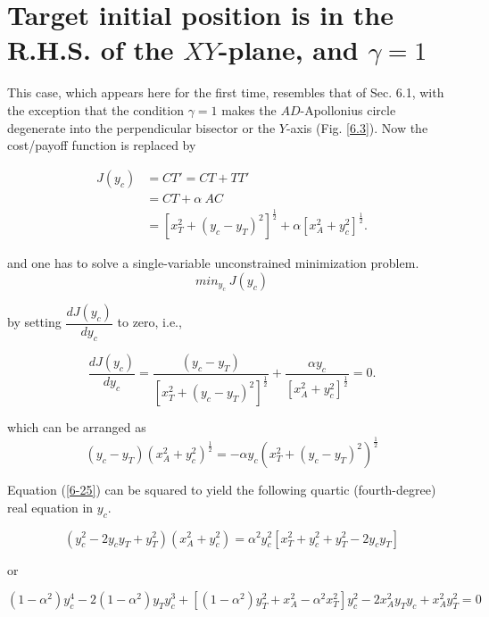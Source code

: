 \section{Target initial position is in the R.H.S. of the $XY$-plane, and $\gamma=1$}
This case, which appears here for the first time, resembles that of Sec. 6.1, with the exception that the condition $\gamma=1$ makes the $AD$-Apollonius circle degenerate into the perpendicular bisector or the $Y$-axis (Fig. \ref{6.3}). Now the cost/payoff function is replaced by 



\begin{equation}
\begin{split}
J(y_c) &= CT' = CT+TT' \\
&=CT+ \alpha\ AC \\
&=[x_T^2 + (y_c - y_T)^2]^{\frac{1}{2}} + \alpha [x_A^2 + y_c^2]^{\frac{1}{2}}.
\label{Jyc}
\end{split}
\end{equation} 

and one has to solve a single-variable unconstrained minimization problem.
\begin{equation}
min_{y_c}\ J(y_c)
\end{equation}

by setting $\dfrac{d J(y_c)}{d y_c}$ to zero, i.e.,

\begin{equation}
\dfrac{d J(y_c)}{d y_c} = \dfrac{(y_c - y_T)}{[x_T^2 + (y_c - y_T)^2]^{\frac{1}{2}}} + \dfrac{\alpha y_c}{[x_A^2 + y_c^2]^{\frac{1}{2}}} =0.
\label{6-24}
\end{equation}

which can be arranged as 
\begin{equation}
(y_c - y_T)(x_A^2 + y_c^2)^{\frac{1}{2}} = - \alpha y_c (x_T^2 + (y_c - y_T)^2)^{\frac{1}{2}}
\label{6-25}
\end{equation}

Equation (\ref{6-25}) can be squared to yield the following quartic (fourth-degree) real equation in $y_c$.

\begin{equation}
(y_c^2 - 2y_c y_T + y_T^2)(x_A^2 + y_c^2)
=\alpha^2 y_c^2 [x_T^2 + y_c^2 + y_T^2 - 2y_c y_T]
\label{6-26}
\end{equation}

or

\begin{equation}
(1-\alpha^2)y_c^4 - 2(1-\alpha^2) y_T y_c^3
+[(1-\alpha^2)y_T^2 + x_A^2 - \alpha^2 x_T^2]y_c^2
-2 x_A^2 y_T y_c + x_A^2 y_T^2 =0
\label{4thPoly}
\end{equation}

